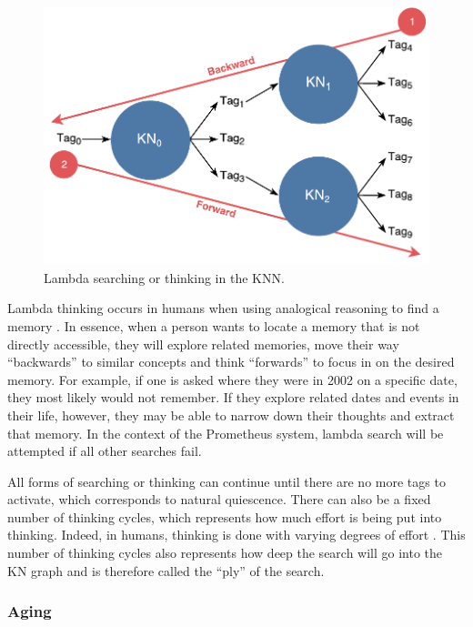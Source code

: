 \documentclass[titlepage,11pt]{article}
\begin{document}
\begin{figure}[!htb]
	\includegraphics[width=\columnwidth]{figures/lambda_search.pdf}
	\caption{Lambda searching or thinking in the KNN.}
	\label{think_lambda}
\end{figure}

Lambda thinking occurs in humans when using analogical reasoning to find a memory \cite{vybihal-lambda}. In essence, when a person wants to locate a memory that is not directly accessible, they will explore related memories, move their way ``backwards'' to similar concepts and think ``forwards'' to focus in on the desired memory. For example, if one is asked where they were in 2002 on a specific date, they most likely would not remember. If they explore related dates and events in their life, however, they may be able to narrow down their thoughts and extract that memory. In the context of the Prometheus system, lambda search will be attempted if all other searches fail.

All forms of searching or thinking can continue until there are no more tags to activate, which corresponds to natural quiescence. There can also be a fixed number of thinking cycles, which represents how much effort is being put into thinking. Indeed, in humans, thinking is done with varying degrees of effort \cite{thinking}. This number of thinking cycles also represents how deep the search will go into the KN graph and is therefore called the ``ply'' of the search.

\subsubsection{Aging}
\label{sec:background_knn_age}
\end{document}

